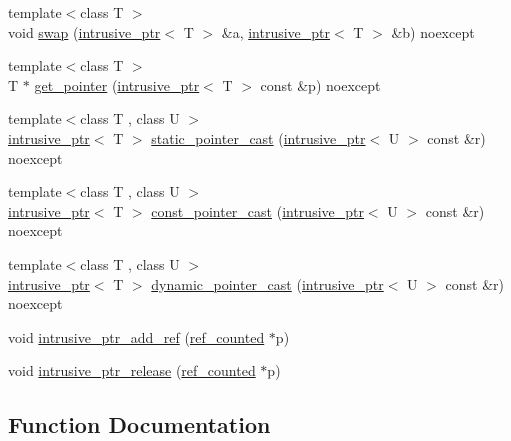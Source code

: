 \begin{DoxyCompactItemize}
\item 
{\footnotesize template$<$class T $>$ }\\void \hyperlink{namespaceactor__zeta_ad670f36d3b7ef3abb5c18b6c297c63d0}{swap} (\hyperlink{classactor__zeta_1_1intrusive__ptr}{intrusive\+\_\+ptr}$<$ T $>$ \&a, \hyperlink{classactor__zeta_1_1intrusive__ptr}{intrusive\+\_\+ptr}$<$ T $>$ \&b) noexcept
\item 
{\footnotesize template$<$class T $>$ }\\T $\ast$ \hyperlink{namespaceactor__zeta_a52fbdab9c41eaeb960819e652c5b6d50}{get\+\_\+pointer} (\hyperlink{classactor__zeta_1_1intrusive__ptr}{intrusive\+\_\+ptr}$<$ T $>$ const \&p) noexcept
\item 
{\footnotesize template$<$class T , class U $>$ }\\\hyperlink{classactor__zeta_1_1intrusive__ptr}{intrusive\+\_\+ptr}$<$ T $>$ \hyperlink{namespaceactor__zeta_a5e6e79b539107476ce1278f21f91c94d}{static\+\_\+pointer\+\_\+cast} (\hyperlink{classactor__zeta_1_1intrusive__ptr}{intrusive\+\_\+ptr}$<$ U $>$ const \&r) noexcept
\item 
{\footnotesize template$<$class T , class U $>$ }\\\hyperlink{classactor__zeta_1_1intrusive__ptr}{intrusive\+\_\+ptr}$<$ T $>$ \hyperlink{namespaceactor__zeta_ad46de81799adbc03fb5a89a5b5129703}{const\+\_\+pointer\+\_\+cast} (\hyperlink{classactor__zeta_1_1intrusive__ptr}{intrusive\+\_\+ptr}$<$ U $>$ const \&r) noexcept
\item 
{\footnotesize template$<$class T , class U $>$ }\\\hyperlink{classactor__zeta_1_1intrusive__ptr}{intrusive\+\_\+ptr}$<$ T $>$ \hyperlink{namespaceactor__zeta_aa7fcd42040b14e3cb112d92f38564e9c}{dynamic\+\_\+pointer\+\_\+cast} (\hyperlink{classactor__zeta_1_1intrusive__ptr}{intrusive\+\_\+ptr}$<$ U $>$ const \&r) noexcept
\item 
void \hyperlink{namespaceactor__zeta_ae83a48a1257a4f720333741d003478d0}{intrusive\+\_\+ptr\+\_\+add\+\_\+ref} (\hyperlink{classactor__zeta_1_1ref__counted}{ref\+\_\+counted} $\ast$p)
\item 
void \hyperlink{namespaceactor__zeta_a9ccb791d78dcd1a7a89f2e879fb738f0}{intrusive\+\_\+ptr\+\_\+release} (\hyperlink{classactor__zeta_1_1ref__counted}{ref\+\_\+counted} $\ast$p)
\end{DoxyCompactItemize}


\subsection{Function Documentation}
\mbox{\label{namespaceactor__zeta_ad46de81799adbc03fb5a89a5b5129703}} 
